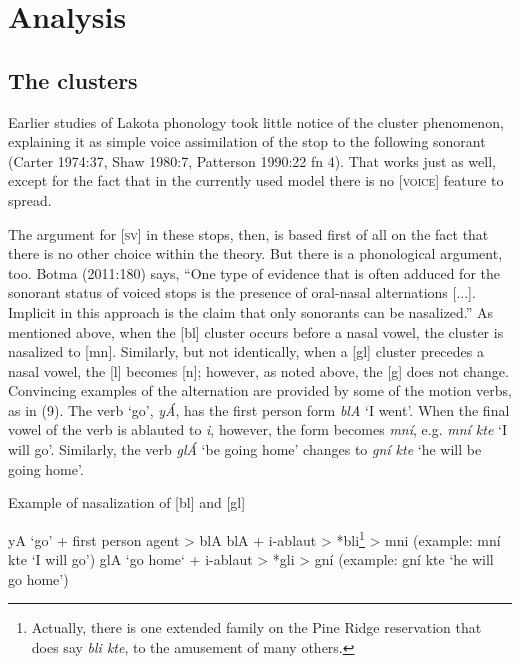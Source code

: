 \documentclass[output=paper]{LSP/langsci}
\begin{document}
\section{Analysis}

\subsection{The clusters}

Earlier studies of Lakota phonology took little notice of the cluster phenomenon, explaining it as simple voice assimilation of the stop to the following sonorant (Carter 1974:37, Shaw 1980:7, Patterson 1990:22 fn 4). That works just as well, except for the fact that in the currently used model there is no [\textsc{voice}] feature to spread.

The argument for [\textsc{sv}] in these stops, then, is based first of all on the fact that there is no other choice within the theory. But there is a phonological argument, too. Botma (2011:180) says, ``One type of evidence that is often adduced for the sonorant status of voiced stops is the presence of oral-nasal alternations [...]. Implicit in this approach is the claim that only sonorants can be nasalized.'' As mentioned above, when the [bl] cluster occurs before a nasal vowel, the cluster is nasalized to [mn]. Similarly, but not identically, when a [gl] cluster precedes a nasal vowel, the [l] becomes [n]; however, as noted above, the [g] does not change. Convincing examples of the alternation are provided by some of the motion verbs, as in (9). The verb `go', \textit{y\'A}, has the first person form \textit{blA} `I went'. When the final vowel of the verb is ablauted to \textit{i}, however, the form becomes \textit{mn\'i}, e.g. \textit{mn\'i kte} `I will go'. Similarly, the verb \textit{gl\'A} `be going home' changes to \textit{gn\'i kte} `he will be going home'.

\begin{exe}
\ex Example of nasalization of [bl] and [gl]
\begin{xlist}
\ex yA `go' + first person agent > blA
\ex blA + i-ablaut > *bli\footnote{Actually, there is one extended family on the Pine Ridge reservation that does say \textit{bli kte}, to the amusement of many others.} > mni (example: mn\'i kte `I will go')
\ex glA `go home` + i-ablaut > *gli > gn\'i (example: gn\'i kte `he will go home')
\end{xlist}
\end{exe}
\end{document}
